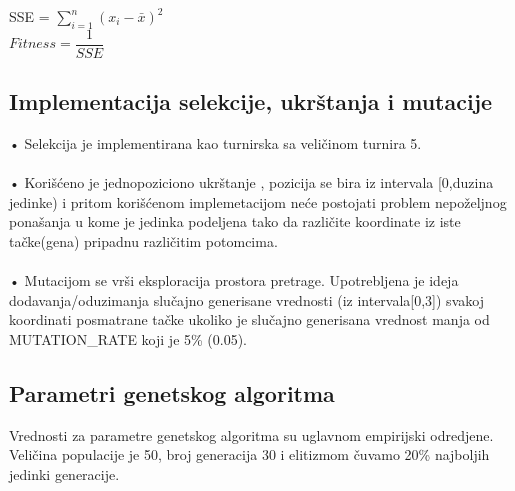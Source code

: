 \documentclass[]{article}
\begin{document}
	SSE = $\sum_{i=1}^{n} (x_i - \bar x)^{2}$\\ 
	
	$ Fitness = \dfrac{1}{SSE}$\\
	
	\subsection{Implementacija selekcije, ukr\v{s}tanja i mutacije}
	\-\quad • Selekcija je implementirana kao turnirska sa veli\v{c}inom turnira 5. \\ \\
	\-\quad • Kori\v{s}\'{c}eno je jednopoziciono ukr\v{s}tanje ,  pozicija se bira iz intervala [0,duzina jedinke)  i pritom kori\v{s}\'{c}enom  implemetacijom  ne\'{c}e postojati problem nepo\v{z}eljnog pona\v{s}anja u kome je jedinka podeljena tako da različite koordinate iz iste ta\v{c}ke(gena) pripadnu razli\v{c}itim potomcima.\\ \\
	\-\quad • Mutacijom se vr\v{s}i eksploracija prostora pretrage. Upotrebljena je ideja dodavanja/oduzimanja slu\v{c}ajno generisane vrednosti (iz intervala[0,3])  svakoj koordinati posmatrane ta\v{c}ke ukoliko je slu\v{c}ajno generisana vrednost manja od MUTATION\_RATE koji je 5\% (0.05).\vspace{0.5cm}\\
	\subsection{Parametri genetskog algoritma}
	Vrednosti za parametre genetskog algoritma su uglavnom empirijski odredjene. Veli\v{c}ina populacije je 50, broj generacija 30 
	i elitizmom \v{c}uvamo 20\% najboljih jedinki generacije. 
	
\end{document}
